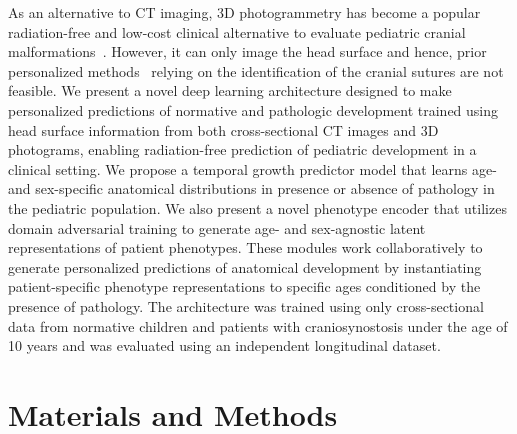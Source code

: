 \documentclass[conference]{IEEEtran}
\begin{document}
As an alternative to CT imaging, 3D photogrammetry has become a popular radiation-free and low-cost clinical alternative to evaluate pediatric cranial malformations~\cite{kurniawan_3d_2024}. However, it can only image the head surface and hence, prior personalized methods~\cite{Liu2023Data-driven} relying on the identification of the cranial sutures are not feasible. We present a novel deep learning architecture designed to make personalized predictions of normative and pathologic development trained using head surface information from both cross-sectional CT images and 3D photograms, enabling radiation-free prediction of pediatric development in a clinical setting. We propose a temporal growth predictor model that learns age- and sex-specific anatomical distributions in presence or absence of pathology in the pediatric population. We also present a novel phenotype encoder that utilizes domain adversarial training to generate age- and sex-agnostic latent representations of patient phenotypes. These modules work collaboratively to generate personalized predictions of anatomical development by instantiating patient-specific phenotype representations to specific ages conditioned by the presence of pathology. The architecture was trained using only cross-sectional data from normative children and patients with craniosynostosis under the age of 10 years and was evaluated using an independent longitudinal dataset.
\section{Materials and Methods}
\end{document}
